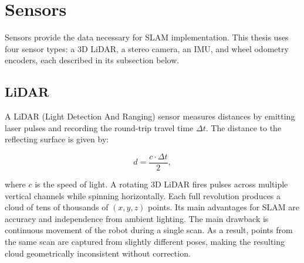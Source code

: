 \section{Sensors}
\label{sec:sensors}

Sensors provide the data necessary for SLAM implementation.
This thesis uses four sensor types: a 3D LiDAR, a stereo camera, an IMU, and wheel
odometry encoders, each described in its subsection below.

\subsection{LiDAR}

A LiDAR (Light Detection And Ranging) sensor measures distances by emitting laser
pulses and recording the round-trip travel time $\Delta t$.
The distance to the reflecting surface is given by:

\begin{equation}
  d = \frac{c \cdot \Delta t}{2},
  \label{eq:lidar_tof}
\end{equation}

\noindent where $c$ is the speed of light.
A rotating 3D LiDAR fires pulses across multiple vertical channels while spinning
horizontally. Each full revolution produces a cloud of tens of thousands of $(x, y, z)$ points.
Its main advantages for SLAM are accuracy and independence from ambient
lighting.
The main drawback is continuous movement of the robot during a single
scan. As a result, points from the same scan are captured from slightly different poses, making
the resulting cloud geometrically inconsistent without correction.

%


